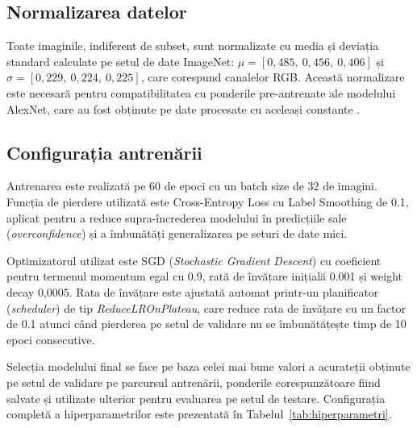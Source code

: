 \subsection{Normalizarea datelor}

Toate imaginile, indiferent de subset, sunt normalizate cu media și deviația standard calculate pe setul de date ImageNet: $\mu = [0{,}485,\ 0{,}456,\ 0{,}406]$ și $\sigma = [0{,}229,\ 0{,}224,\ 0{,}225]$, care corespund canalelor RGB. Această normalizare este necesară pentru compatibilitatea cu ponderile pre-antrenate ale modelului AlexNet, care au fost obținute pe date procesate cu aceleași constante \cite{krizhevsky2012imagenet}.

\subsection{Configurația antrenării}

Antrenarea este realizată pe 60 de epoci cu un batch size de 32 de imagini. Funcția de pierdere utilizată este Cross-Entropy Loss cu Label Smoothing de 0.1, aplicat pentru a reduce supra-încrederea modelului  în predicțiile sale (\textit{overconfidence}) și a îmbunătăți generalizarea pe seturi de date mici.

Optimizatorul utilizat este SGD (\textit{Stochastic Gradient Descent}) cu coeficient pentru termenul momentum egal cu 0.9, rată de învățare inițială 0.001 și weight decay 0,0005. Rata de învățare este ajustată automat printr-un planificator (\textit{scheduler}) de tip \textit{ReduceLROnPlateau}, care reduce rata de învățare cu un factor de 0.1 atunci când pierderea pe setul de validare nu se îmbunătățește timp de 10 epoci consecutive.

Selecția modelului final se face pe baza celei mai bune valori a acurateții obținute pe setul de validare pe parcursul antrenării, ponderile corespunzătoare fiind salvate și utilizate ulterior pentru evaluarea pe setul de testare. Configurația completă a hiperparametrilor este prezentată în Tabelul~\ref{tab:hiperparametri}.

